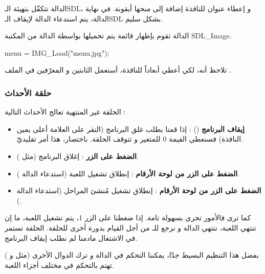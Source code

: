 الدالة
تتكفّل بتهيئة الـ\textenglish{SDL}،
و إعطاء عنوان للنافذة إضافة إلى منحها أيقونة. في نهاية الدالة، يتم استدعاء الدالة 
 لإيقاف الـ\textenglish{SDL}
بشكل سليم.

الدالة تقوم بإظهار قائمة يتم تحميلها بواسطة الدالة 
من المكتبة
\textenglish{SDL\_Image}.

\begin{Csource}
menu = IMG_Load("menu.jpg");
\end{Csource}

تلاحظ أنه، لكي أعطي أبعاداً للنافذة، أستعمل الثابتين
و
المعرّفين في الملف
.

\subsubsection{حلقة الأحداث}

الحلقة غير المنتهية تعالج الأحداث التالية :

\begin{itemize}
	\item \textbf{إيقاف البرنامج}
	() :
	إذا قمنا بطلب غلق البرنامج (النقر على العلامة
	أعلى يمين النافذة) فسنعطي القيمة 0 للمتغير
	و تتوقف الحلقة. باختصار، هذا أمر تقليديّ.
	\item \textbf{الضغط على الزر
		} :
	إغلاق البرنامج (مثل
	).
	\item \textbf{الضغط على الزر
	من لوحة الأرقام} :
	إنطلاق تشغيل اللعبة (استدعاء الدالة 
	).
	\item \textbf{الضغط على الزر
	من لوحة الأرقام} :
	إنطلاق تشغيل مُنشئ المراحل (استدعاء الدالة
	).
\end{itemize}

كما ترى فالأمور تجري بسهولة تامة. إذا ضغطنا على الزر 1، يتم تشغيل اللعبة، ما إن تنتهي اللعبة، تنتهي الدالة
و نرجع للـ
من أجل القيام بدورة أخرى للحلقة. الحلقة تستمر في الاشتغال مادمنا لم نطلب إيقاف البرنامج.

بفضل هذا التنظيم البسيط جدّا، يمكننا التحكم في الدالة
و ترك الدوال الأخرى (مثل
و
)
تهتم بالتحكم في مختلف أجزاء اللعبة.
